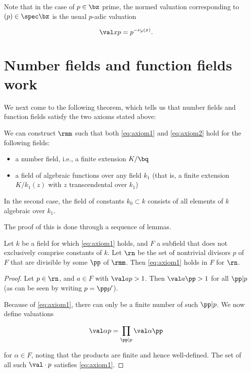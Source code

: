 Note that in the case of $p\in\bz$ prime, the normed valuation corresponding to
$(p)\in\spec\bz$ is the usual $p$-adic valuation

\[ \val x p = p^{-\nu_p(x)}. \]

\section{Number fields and function fields work}
We next come to the following theorem, which tells us that number fields and
function fields satisfy the two axioms stated above:

\begin{thm}
  \label{thm:works}
  We can construct $\rmm$ such that both \ref{eq:axiom1} and \ref{eq:axiom2} hold
  for the following fields:
  \begin{itemize}
  \item a number field, i.e., a finite extension $K/\bq$
  \item a field of algebraic functions over any field $k_1$ (that is, a finite
    extension $K/k_1(z)$ with $z$ transcendental over $k_1$)
  \end{itemize}
  In the second case, the field of constants $k_0 \subset k$ consists of all
  elements of $k$ algebraic over $k_1$.
\end{thm}

The proof of this is done through a sequence of lemmas.

\begin{lemma}
  Let $k$ be a field for which \ref{eq:axiom1} holds, and $F$ a subfield that
  does not exclusively comprise constants of $k$. Let $\rn$ be the set of
  nontrivial divisors $p$ of $F$ that are divisible by some $\pp$ of $\rmm$.
  Then \ref{eq:axiom1} holds in $F$ for $\rn$.
\end{lemma}

\begin{proof}
  Let $p \in\rn$, and $a\in F$ with $\val a p > 1$. Then $\val a \pp > 1$ for all
  $\pp|p$ (as can be seen by writing $p = \pp p'$).

  Because of \ref{eq:axiom1}, there can only be a finite number of such
  $\pp|p$. We now define valuations

  \[ \val \alpha p = \prod_{\pp|p} \val \alpha \pp \]

  for $\alpha\in F$, noting that the products are finite and hence well-defined.
  The set of all such $\val \cdot p$ satisfies \ref{eq:axiom1}.
\end{proof}

